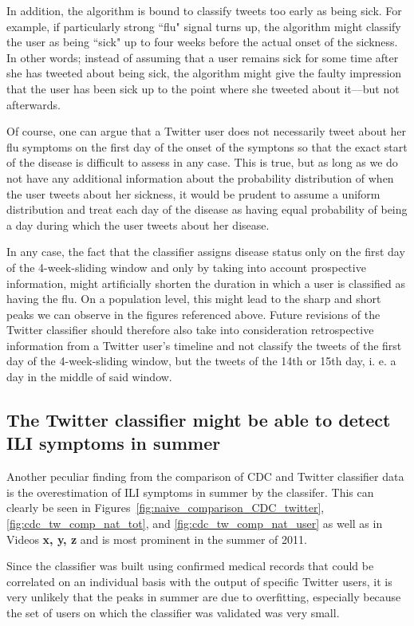 \documentclass[11pt, a4paper,twoside]{report}\usepackage[]{graphicx}\usepackage[]{color}
\begin{document}
In addition, the algorithm is bound to classify tweets too early as being sick. For example, if particularly strong ``flu" signal turns up, the algorithm might classify the user as being ``sick" up to four weeks before the actual onset of the sickness. In other words; instead of assuming that a user remains sick for some time after she has tweeted about being sick, the algorithm might give the faulty impression that the user has been sick up to the point where she tweeted about it---but not afterwards.

Of course, one can argue that a Twitter user does not necessarily tweet about her flu symptoms on the first day of the onset of the symptons so that the exact start of the disease is difficult to assess in any case. This is true, but as long as we do not have any additional information about the probability distribution of when the user tweets about her sickness, it would be prudent to assume a uniform distribution and treat each day of the disease as having equal probability of being a day during which the user tweets about her disease. 

In any case, the fact that the classifier assigns disease status only on the first day of the 4-week-sliding window and only by taking into account prospective information, might artificially shorten the duration in which a user is classified as having the flu. On a population level, this might lead to the sharp and short peaks we can observe in the figures referenced above. Future revisions of the Twitter classifier should therefore also take into consideration retrospective information from a Twitter user's timeline and not classify the tweets of the first day of the 4-week-sliding window, but the tweets of the 14th or 15th day, i. e. a day in the middle of said window.

\subsection{The Twitter classifier might be able to detect ILI symptoms in summer}
Another peculiar finding from the comparison of CDC and Twitter classifier data is the overestimation of ILI symptoms in summer by the classifer. This can clearly be seen in Figures~\ref{fig:naive_comparison_CDC_twitter}, \ref{fig:cdc_tw_comp_nat_tot}, and \ref{fig:cdc_tw_comp_nat_user} as well as in Videos \textbf{x, y, z} and is most prominent in the summer of 2011. 

Since the classifier was built using confirmed medical records that could be correlated on an individual basis with the output of specific Twitter users, it is very unlikely that the peaks in summer are due to overfitting, especially because the set of users on which the classifier was validated was very small. 
\end{document}
